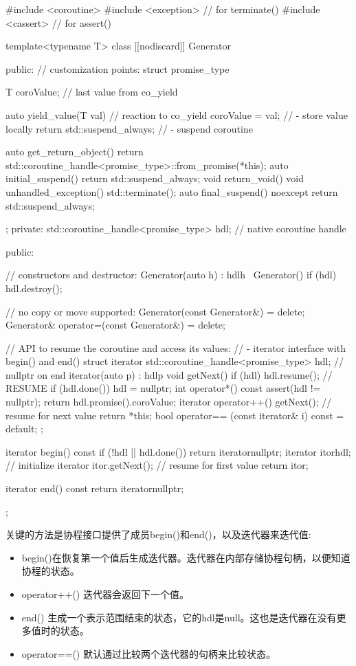\begin{cpp}
#include <coroutine>
#include <exception> // for terminate()
#include <cassert> // for assert()

template<typename T>
class [[nodiscard]] Generator {
	public:
	// customization points:
	struct promise_type {
		T coroValue{}; // last value from co_yield
		
		auto yield_value(T val) { // reaction to co_yield
			coroValue = val; // - store value locally
			return std::suspend_always{}; // - suspend coroutine
		}
		
		auto get_return_object() {
			return std::coroutine_handle<promise_type>::from_promise(*this);
		}
		auto initial_suspend() { return std::suspend_always{}; }
		void return_void() { }
		void unhandled_exception() { std::terminate(); }
		auto final_suspend() noexcept { return std::suspend_always{}; }
	};
private:
	std::coroutine_handle<promise_type> hdl; // native coroutine handle
	
public:
	
	// constructors and destructor:
	Generator(auto h) : hdl{h} { }
	~Generator() { if (hdl) hdl.destroy(); }
	
	// no copy or move supported:
	Generator(const Generator&) = delete;
	Generator& operator=(const Generator&) = delete;
	
	// API to resume the coroutine and access its values:
	// - iterator interface with begin() and end()
	struct iterator {
		std::coroutine_handle<promise_type> hdl; // nullptr on end
		iterator(auto p) : hdl{p} {
		}
		void getNext() {
			if (hdl) {
				hdl.resume(); // RESUME
				if (hdl.done()) {
					hdl = nullptr;
				}
			}
		}
		int operator*() const {
			assert(hdl != nullptr);
			return hdl.promise().coroValue;
		}
		iterator operator++() {
			getNext(); // resume for next value
			return *this;
		}
		bool operator== (const iterator& i) const = default;
	};
	
	iterator begin() const {
		if (!hdl || hdl.done()) {
			return iterator{nullptr};
		}
		iterator itor{hdl}; // initialize iterator
		itor.getNext(); // resume for first value
		return itor;
	}
	
	iterator end() const {
		return iterator{nullptr};
	}
};
\end{cpp}

关键的方法是协程接口提供了成员begin()和end()，以及迭代器来迭代值:

\begin{itemize}
\item 
begin()在恢复第一个值后生成迭代器。迭代器在内部存储协程句柄，以便知道协程的状态。

\item 
operator++() 迭代器会返回下一个值。

\item 
end() 生成一个表示范围结束的状态，它的hdl是null。这也是迭代器在没有更多值时的状态。

\item 
operator==() 默认通过比较两个迭代器的句柄来比较状态。
\end{itemize}

